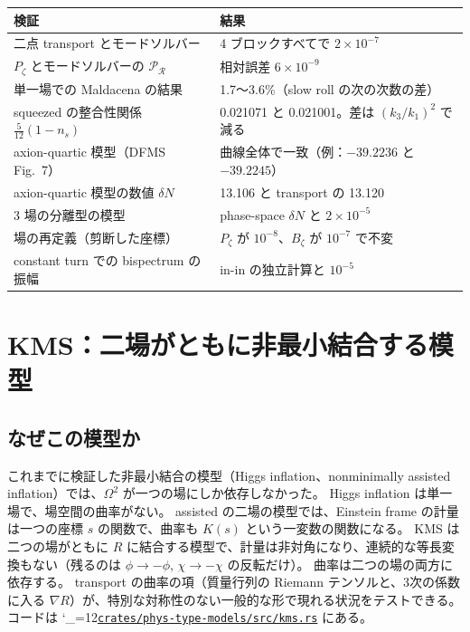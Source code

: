 \documentclass[a4paper,11pt]{ltjsarticle}
\newcommand{\repourl}{https://github.com/inuverse44/phys-type}
\newcommand{\reporev}{b1fea87}
\newcommand{\repo}{\begingroup\catcode`\_=12\relax\repoaux}
\newcommand{\repoaux}[1]{\href{\repourl/blob/\reporev/#1}{\nolinkurl{#1}}\endgroup}
\begin{document}
\begin{center}
\small
\begin{tabular}{p{6.2cm}p{7.4cm}}
\toprule
検証 & 結果 \\
\midrule
二点 transport とモードソルバー & 4 ブロックすべてで $2\times10^{-7}$ \\
$P_\zeta$ とモードソルバーの $\mathcal P_{\mathcal R}$ & 相対誤差 $6\times10^{-9}$ \\
単一場での Maldacena の結果 & 1.7〜3.6\%（slow roll の次の次数の差） \\
squeezed の整合性関係 $\tfrac5{12}(1-n_s)$ & 0.021071 と 0.021001。差は $(k_3/k_1)^2$ で減る \\
axion-quartic 模型\cite{Elliston2012}（DFMS Fig.~7\cite{DFMS2016}） & 曲線全体で一致（例：$-39.2236$ と $-39.2245$） \\
axion-quartic 模型の数値 $\delta N$ & 13.106 と transport の 13.120 \\
3 場の分離型の模型\cite{BattefeldEasther2007} & phase-space $\delta N$ と $2\times10^{-5}$ \\
場の再定義（剪断した座標） & $P_\zeta$ が $10^{-8}$、$B_\zeta$ が $10^{-7}$ で不変 \\
constant turn での bispectrum の振幅\cite{HMPS2026b} & in-in の独立計算と $10^{-5}$ \\
\bottomrule
\end{tabular}
\end{center}

\section{KMS：二場がともに非最小結合する模型}
\label{sec:kms}

\subsection{なぜこの模型か}

これまでに検証した非最小結合の模型（Higgs inflation\cite{BezrukovShaposhnikov2008}、nonminimally assisted inflation\cite{HKKPT2023}）では、$\Omega^2$ が一つの場にしか依存しなかった。
Higgs inflation は単一場で、場空間の曲率がない。
assisted の二場の模型では、Einstein frame の計量は一つの座標 $s$ の関数で、曲率も $K(s)$ という一変数の関数になる。
KMS は二つの場がともに $R$ に結合する模型で、計量は非対角になり、連続的な等長変換もない（残るのは $\phi\to-\phi$, $\chi\to-\chi$ の反転だけ）。
曲率は二つの場の両方に依存する。
transport の曲率の項（質量行列の Riemann テンソルと、3次の係数に入る $\nabla R$）が、特別な対称性のない一般的な形で現れる状況をテストできる。
コードは \repo{crates/phys-type-models/src/kms.rs} にある。
\end{document}

